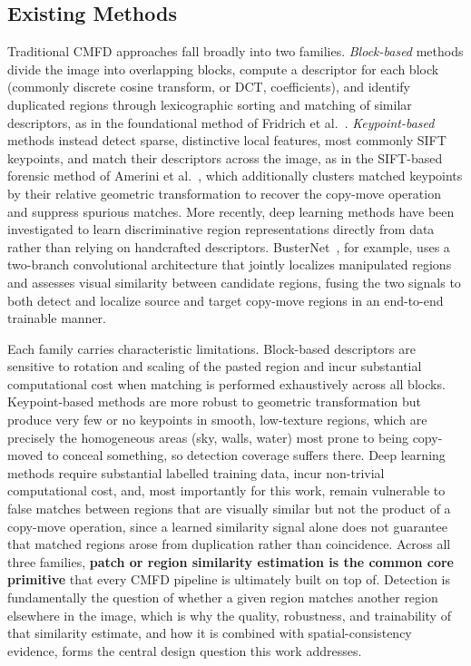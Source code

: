 \documentclass[conference]{IEEEtran}
\begin{document}
\subsection{Existing Methods}
Traditional CMFD approaches fall broadly into two families. \emph{Block-based} methods divide the image into overlapping blocks, compute a descriptor for each block (commonly discrete cosine transform, or DCT, coefficients), and identify duplicated regions through lexicographic sorting and matching of similar descriptors, as in the foundational method of Fridrich et al.~\cite{fridrich2003}. \emph{Keypoint-based} methods instead detect sparse, distinctive local features, most commonly SIFT keypoints, and match their descriptors across the image, as in the SIFT-based forensic method of Amerini et al.~\cite{amerini2011}, which additionally clusters matched keypoints by their relative geometric transformation to recover the copy-move operation and suppress spurious matches. More recently, deep learning methods have been investigated to learn discriminative region representations directly from data rather than relying on handcrafted descriptors. BusterNet~\cite{busternet2018}, for example, uses a two-branch convolutional architecture that jointly localizes manipulated regions and assesses visual similarity between candidate regions, fusing the two signals to both detect and localize source and target copy-move regions in an end-to-end trainable manner.

Each family carries characteristic limitations. Block-based descriptors are sensitive to rotation and scaling of the pasted region and incur substantial computational cost when matching is performed exhaustively across all blocks. Keypoint-based methods are more robust to geometric transformation but produce very few or no keypoints in smooth, low-texture regions, which are precisely the homogeneous areas (sky, walls, water) most prone to being copy-moved to conceal something, so detection coverage suffers there. Deep learning methods require substantial labelled training data, incur non-trivial computational cost, and, most importantly for this work, remain vulnerable to false matches between regions that are visually similar but not the product of a copy-move operation, since a learned similarity signal alone does not guarantee that matched regions arose from duplication rather than coincidence. Across all three families, \textbf{patch or region similarity estimation is the common core primitive} that every CMFD pipeline is ultimately built on top of. Detection is fundamentally the question of whether a given region matches another region elsewhere in the image, which is why the quality, robustness, and trainability of that similarity estimate, and how it is combined with spatial-consistency evidence, forms the central design question this work addresses.
\end{document}
